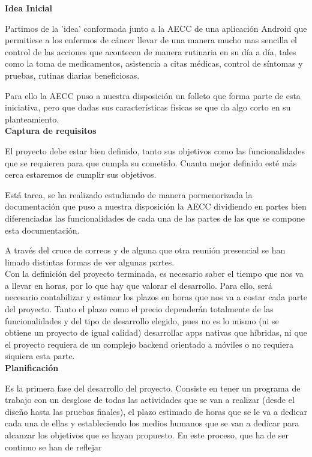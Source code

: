 \documentclass[../pfc.tex]{subfiles}
\begin{document}
	\textbf{Idea Inicial}
	
	Partimos de la 'idea' conformada junto a la AECC de una aplicación Android  que permitiese a los enfermos de cáncer llevar de una manera mucho mas sencilla el control de las acciones que acontecen de manera rutinaria en su día a día, tales como la toma de medicamentos, asistencia a citas médicas, control de síntomas y pruebas, rutinas diarias beneficiosas.
	
	Para ello la AECC puso a nuestra disposición un folleto que forma parte de esta iniciativa, pero que dadas sus características físicas se que da algo corto en su planteamiento.\\
	
	\textbf{Captura de requisitos}
	
	El proyecto debe estar bien definido, tanto sus objetivos como las funcionalidades que se requieren para que cumpla su cometido. Cuanta mejor definido esté más cerca estaremos de cumplir sus objetivos.
	
	Está tarea, se ha realizado estudiando de manera pormenorizada la documentación que puso a nuestra disposición la AECC dividiendo en partes bien diferenciadas las funcionalidades de cada una de las partes de las que se compone esta documentación.
	
	A través del cruce de correos y de alguna que otra reunión presencial se han limado distintas formas de ver algunas partes.\\
	
		
	Con la definición del proyecto terminada, es necesario saber el tiempo que nos va a llevar en horas, por lo que hay que valorar el desarrollo. Para ello, será necesario contabilizar y estimar los plazos en horas que nos va a costar cada parte del proyecto. Tanto el plazo como el precio dependerán totalmente de las funcionalidades y del tipo de desarrollo elegido, pues no es lo mismo (ni se obtiene un proyecto de igual calidad) desarrollar apps nativas que híbridas, ni que el proyecto requiera de un complejo backend orientado a móviles o no requiera siquiera esta parte.\\
	
	\textbf{Planificación} 
		
	Es la primera fase del desarrollo del proyecto. Consiste en tener un programa de trabajo con un desglose de todas las actividades que se van a realizar (desde el diseño hasta las pruebas finales), el plazo estimado de horas que se le va a dedicar cada una de ellas y estableciendo los medios humanos que se van a dedicar para alcanzar los objetivos que se hayan propuesto. En este proceso, que ha de ser continuo se han de reflejar\\
	
\end{document}
